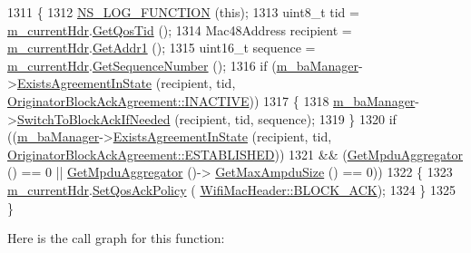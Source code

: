 \begin{DoxyCode}
1311 \{
1312   \hyperlink{log-macros-disabled_8h_a90b90d5bad1f39cb1b64923ea94c0761}{NS\_LOG\_FUNCTION} (\textcolor{keyword}{this});
1313   uint8\_t tid = \hyperlink{classns3_1_1DcaTxop_ae965eb2f4d504e00526e751cd1dab3a6}{m\_currentHdr}.\hyperlink{classns3_1_1WifiMacHeader_a2b3faf14ac0d16a29729a2336afd7662}{GetQosTid} ();
1314   Mac48Address recipient = \hyperlink{classns3_1_1DcaTxop_ae965eb2f4d504e00526e751cd1dab3a6}{m\_currentHdr}.\hyperlink{classns3_1_1WifiMacHeader_a5ddcfd82e7c5a17ffea5be9246544530}{GetAddr1} ();
1315   uint16\_t sequence = \hyperlink{classns3_1_1DcaTxop_ae965eb2f4d504e00526e751cd1dab3a6}{m\_currentHdr}.\hyperlink{classns3_1_1WifiMacHeader_aa202a29c2d6aebe9b3d589e58cbd17bb}{GetSequenceNumber} ();
1316   \textcolor{keywordflow}{if} (\hyperlink{classns3_1_1EdcaTxopN_a7a79eaafe03995bb274451aa752b83b2}{m\_baManager}->\hyperlink{classns3_1_1BlockAckManager_ae13c4678f75ebfda7f63d0521878662b}{ExistsAgreementInState} (recipient, tid, 
      \hyperlink{classns3_1_1OriginatorBlockAckAgreement_ab33ae8af8c458aca7437a472778e4761a57155e6fa589ec94dcd8be08ef6dd837}{OriginatorBlockAckAgreement::INACTIVE}))
1317     \{
1318       \hyperlink{classns3_1_1EdcaTxopN_a7a79eaafe03995bb274451aa752b83b2}{m\_baManager}->\hyperlink{classns3_1_1BlockAckManager_a20324b49d01312f731087f7f707a596a}{SwitchToBlockAckIfNeeded} (recipient, tid, sequence);
1319     \}
1320   \textcolor{keywordflow}{if} ((\hyperlink{classns3_1_1EdcaTxopN_a7a79eaafe03995bb274451aa752b83b2}{m\_baManager}->\hyperlink{classns3_1_1BlockAckManager_ae13c4678f75ebfda7f63d0521878662b}{ExistsAgreementInState} (recipient, tid, 
      \hyperlink{classns3_1_1OriginatorBlockAckAgreement_ab33ae8af8c458aca7437a472778e4761a341f78e1e094b88dea42e94b32871067}{OriginatorBlockAckAgreement::ESTABLISHED}))
1321       && (\hyperlink{classns3_1_1EdcaTxopN_aa8beff92afb46fd336cdf35cb0f451c9}{GetMpduAggregator} () == 0 || \hyperlink{classns3_1_1EdcaTxopN_aa8beff92afb46fd336cdf35cb0f451c9}{GetMpduAggregator} ()->
      \hyperlink{classns3_1_1MpduAggregator_a781ed153a388bbc8a5ac231cfd9218c8}{GetMaxAmpduSize} () == 0))
1322     \{
1323       \hyperlink{classns3_1_1DcaTxop_ae965eb2f4d504e00526e751cd1dab3a6}{m\_currentHdr}.\hyperlink{classns3_1_1WifiMacHeader_a0f884f7997eaf10238ad3c2367332e82}{SetQosAckPolicy} (
      \hyperlink{classns3_1_1WifiMacHeader_ae3a382482f357972019f5e1b3162adc4a8d2763ea0083f1265fbf7dda6fdcf9fd}{WifiMacHeader::BLOCK\_ACK});
1324     \}
1325 \}
\end{DoxyCode}


Here is the call graph for this function\+:




